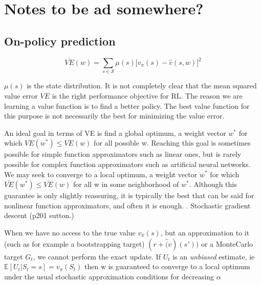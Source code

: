 
\chapter{Notes to be ad somewhere?}
\section{On-policy prediction}
\begin{equation}
    \overline{VE}(w)= \sum_{s \in \mathcal{S}} \mu(s) \big [v_\pi(s) - \hat{v}(s,w)      \big]^2
\end{equation}

$ \mu(s)$ is the state distribution.
It is not completely clear that the mean squared value error  $\overline{VE}$ is the right performance objective for RL.
The reason we are learning a value function is to find a better policy. The best value function for this purpose is not 
necessarily the best for minimizing the value error.

An ideal goal in terms of VE is find a global optimum, a weight vector $w^*$ for which
$\overline{VE}(w^*) \leq \overline{VE}(w)$ for all possible w. Reaching this goal is sometimes possible for simple
function approximators such as linear ones, but is rarely possible for complex function approximators such as artificial neural
networks.
We may seek to converge to a local optimum, a weight vector $w^*$ for which
$\overline{VE}(w^*) \leq \overline{VE}(w)$ for all w in some neighborhood of $w^*$.
Although this guarantee is only slightly reassuring, it is typically the best that can be
said for nonlinear function approximators, and often it is enough.  \citet{Sutton1998}.
Stochastic gradient descent (p201 sutton.)


When we have no access to the true value $v_\pi(s)$, but an approximation to it 
(such as for example a bootstrapping target)
$(r+\hat(v)(s'))$ or a MonteCarlo target $G_t$, we cannot perform the exact update.
If $U_t$ is an \textit{unbiased} estimate, ie $\mathbb E [U_t | S_t = s] = v_\pi(S_t)$
then w is guaranteed to converge to a local optimum under
the usual stochastic approximation conditions for decreasing $\alpha$ 

